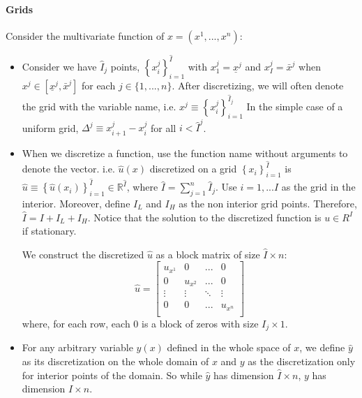 \documentclass[11pt]{article}
\newcommand{\set}[1]{\ensuremath{\left\{{#1}\right\}}}
\newcommand{\R}{\ensuremath{\mathbb{R}}}
\begin{document}
	\paragraph{Grids}Consider the multivariate function of $x = (x^1,...,x^n )$:
	\begin{itemize}
		\item Consider we have $\hat{I}_j$ points, $\set{x^j_i}_{i=1}^{\hat{I}}$ with $x^j_1 = \underline{x}^j$ and $x^j_I = \bar{x}^j$ when $x^j \in [\underline{x}^j, \bar{x}^j]$ for each $j \in \{1,...,n\}$.  After discretizing, we will often denote the grid with the variable name, i.e. $x^j \equiv \set{x^j_i}_{i=1}^{\hat{I}_j}$
		In the simple case of a uniform grid, $\Delta^j \equiv x_{i+1}^j - x_i^j$ for all $i < \hat{I}^j$.
		\item When we discretize a function, use the function name without arguments to denote the vector.  i.e. $\hat{u}(x)$ discretized on a grid $\set{x_i}_{i=1}^{\hat{I}}$  is $\hat{u} \equiv \set{\hat{u}(x_i)}_{i=1}^{\hat{I}} \in \R^{\hat{I}}$, where $\hat{I} = \sum_{j=1}^n \hat{I}_j$.
		Use $i=1,... I$ as the grid in the interior. Moreover, define $I_L$ and $I_H$ as the non interior grid points. Therefore, $\hat{I} = I + I_L + I_H$. Notice that the solution to the discretized function is $u \in R^I$ if stationary.
		
		We construct the discretized $\hat{u}$ as a block matrix of size $\hat{I}\times n$:
		\begin{equation}
		\hat{u} = \begin{bmatrix}
		u_{x^1} & 0       & ...    & 0\\
		0       & u_{x^2} & ...    & 0\\
		\vdots  & \vdots  & \ddots & \vdots \\
		0       & 0       & ...    & u_{x^n}\\
		\end{bmatrix}\label{u_def}
		\end{equation}
		where, for each row, each 0 is a block of zeros with size $I_j \times 1$.
		
		
		
		\item For any arbitrary variable $y(x)$ defined in the whole space of $x$, we define $\hat{y}$ as its discretization on the whole domain of $x$ and $y$ as the discretization only for interior points of the domain. So while $\hat{y}$ has dimension $\hat{I} \times n$, $y$ has dimension $I \times n$.
	\end{itemize}
	
\end{document}
